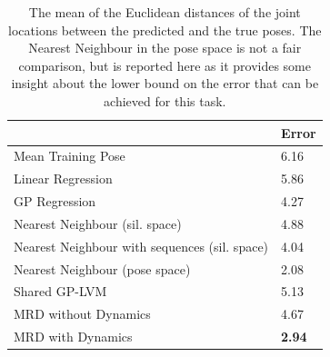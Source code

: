 \begin{table}[h]
\caption{
\label{humanMotionTable}
The mean of the Euclidean distances of the joint locations between the predicted and the true poses.
The Nearest Neighbour in the pose space
is not a fair comparison, but is reported here as it provides some insight about the
lower bound on the error that can be achieved for this task.
}
\begin{small}
\begin{center}
\begin{tabular}{ l | l }
						 	   & Error \\ \hline %
Mean Training Pose		       & 6.16   \\ %
Linear Regression		       & 5.86   \\ %
GP Regression 			       & 4.27   \\ %
Nearest Neighbour (sil. space) & 4.88  \\ %
Nearest Neighbour with sequences (sil. space) & 4.04  \\ %
\textcolor{light-gray}{Nearest Neighbour (pose space)} & \textcolor{light-gray}{2.08}   \\ %
Shared GP-LVM				       & 5.13    \\ %
MRD	without Dynamics       & 4.67   \\ %
MRD with Dynamics	       & \textbf{2.94}    \\ \hline
\end{tabular}
\end{center}
\end{small}
\end{table}



